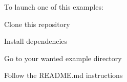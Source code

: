 To launch one of this examples\+:


\begin{DoxyItemize}
\item Clone this repository
\item Install dependencies
\item Go to your wanted example directory
\item Follow the README.\+md instructions 
\end{DoxyItemize}